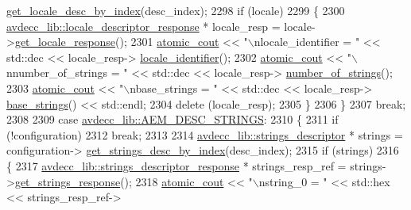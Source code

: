 \begin{DoxyCode}
      \hyperlink{classavdecc__lib_1_1configuration__descriptor_a7d32e35d54b0dfaa2e99318315029269}{get\_locale\_desc\_by\_index}(desc\_index);
2298         \textcolor{keywordflow}{if} (locale)
2299         \{
2300             \hyperlink{classavdecc__lib_1_1locale__descriptor__response}{avdecc\_lib::locale\_descriptor\_response} * locale\_resp = 
      locale->\hyperlink{classavdecc__lib_1_1locale__descriptor_afdc23d6d0ce61b2dcf7b5c9578f26b52}{get\_locale\_response}();
2301             \hyperlink{cmd__line_8h_a0bc38ccc65c79ba06c6fcd7b4bf554c3}{atomic\_cout} << \textcolor{stringliteral}{"\(\backslash\)nlocale\_identifier = "} << std::dec << locale\_resp->
      \hyperlink{classavdecc__lib_1_1locale__descriptor__response_a3d76182b9de2bf361ffaa6e7bd80d83c}{locale\_identifier}();
2302             \hyperlink{cmd__line_8h_a0bc38ccc65c79ba06c6fcd7b4bf554c3}{atomic\_cout} << \textcolor{stringliteral}{"\(\backslash\)nnumber\_of\_strings = "} << std::dec << locale\_resp->
      \hyperlink{classavdecc__lib_1_1locale__descriptor__response_af96235b5eab6537591e04e3ca5c20399}{number\_of\_strings}();
2303             \hyperlink{cmd__line_8h_a0bc38ccc65c79ba06c6fcd7b4bf554c3}{atomic\_cout} << \textcolor{stringliteral}{"\(\backslash\)nbase\_strings = "} << std::dec << locale\_resp->
      \hyperlink{classavdecc__lib_1_1locale__descriptor__response_ac7b74a81dead72df37408db4bd419b67}{base\_strings}() << std::endl;
2304             \textcolor{keyword}{delete} (locale\_resp);
2305         \}
2306     \}
2307     \textcolor{keywordflow}{break};
2308 
2309     \textcolor{keywordflow}{case} \hyperlink{namespaceavdecc__lib_ac7b7d227e46bc72b63ee9e9aae15902fa526663b7fb24c091547f86797eec03e0}{avdecc\_lib::AEM\_DESC\_STRINGS}:
2310     \{
2311         \textcolor{keywordflow}{if} (!configuration)
2312             \textcolor{keywordflow}{break};
2313 
2314         \hyperlink{classavdecc__lib_1_1strings__descriptor}{avdecc\_lib::strings\_descriptor} * strings = configuration->
      \hyperlink{classavdecc__lib_1_1configuration__descriptor_a34531c290e12e85895a804c067e9919e}{get\_strings\_desc\_by\_index}(desc\_index);
2315         \textcolor{keywordflow}{if} (strings)
2316         \{
2317             \hyperlink{classavdecc__lib_1_1strings__descriptor__response}{avdecc\_lib::strings\_descriptor\_response} * 
      strings\_resp\_ref = strings->\hyperlink{classavdecc__lib_1_1strings__descriptor_a313776812dd7fa955eb6e60c9c92956a}{get\_strings\_response}();
2318             \hyperlink{cmd__line_8h_a0bc38ccc65c79ba06c6fcd7b4bf554c3}{atomic\_cout} << \textcolor{stringliteral}{"\(\backslash\)nstring\_0 = "} << std::hex << strings\_resp\_ref->

\end{DoxyCode}

